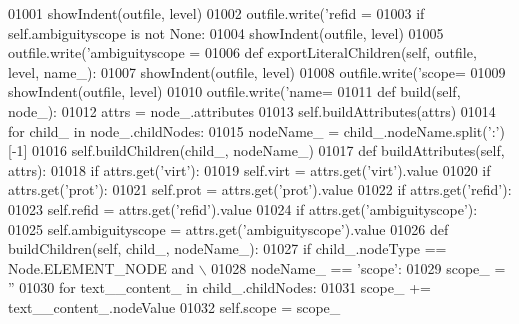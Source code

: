 \begin{DoxyCode}
{{{{{{{{{{{{{{{{{{{{{{{{{{{{{{{{{{{{{{{{{{{{{{{01001             showIndent(outfile, level)
01002             outfile.write(\textcolor{stringliteral}{'refid = %
01003         \textcolor{keywordflow}{if} self.ambiguityscope \textcolor{keywordflow}{is} \textcolor{keywordflow}{not} \textcolor{keywordtype}{None}:
01004             showIndent(outfile, level)
01005             outfile.write(\textcolor{stringliteral}{'ambiguityscope = %
01006     \textcolor{keyword}{def }exportLiteralChildren(self, outfile, level, name\_):
01007         showIndent(outfile, level)
01008         outfile.write(\textcolor{stringliteral}{'scope=%
01009         showIndent(outfile, level)
01010         outfile.write(\textcolor{stringliteral}{'name=%
01011     \textcolor{keyword}{def }build(self, node\_):
01012         attrs = node\_.attributes
01013         self.buildAttributes(attrs)
01014         \textcolor{keywordflow}{for} child\_ \textcolor{keywordflow}{in} node\_.childNodes:
01015             nodeName\_ = child\_.nodeName.split(\textcolor{stringliteral}{':'})[-1]
01016             self.buildChildren(child\_, nodeName\_)
01017     \textcolor{keyword}{def }buildAttributes(self, attrs):
01018         \textcolor{keywordflow}{if} attrs.get(\textcolor{stringliteral}{'virt'}):
01019             self.virt = attrs.get(\textcolor{stringliteral}{'virt'}).value
01020         \textcolor{keywordflow}{if} attrs.get(\textcolor{stringliteral}{'prot'}):
01021             self.prot = attrs.get(\textcolor{stringliteral}{'prot'}).value
01022         \textcolor{keywordflow}{if} attrs.get(\textcolor{stringliteral}{'refid'}):
01023             self.refid = attrs.get(\textcolor{stringliteral}{'refid'}).value
01024         \textcolor{keywordflow}{if} attrs.get(\textcolor{stringliteral}{'ambiguityscope'}):
01025             self.ambiguityscope = attrs.get(\textcolor{stringliteral}{'ambiguityscope'}).value
01026     \textcolor{keyword}{def }buildChildren(self, child\_, nodeName\_):
01027         \textcolor{keywordflow}{if} child\_.nodeType == Node.ELEMENT\_NODE \textcolor{keywordflow}{and} \(\backslash\)
01028             nodeName\_ == \textcolor{stringliteral}{'scope'}:
01029             scope\_ = \textcolor{stringliteral}{''}
01030             \textcolor{keywordflow}{for} text\_\_content\_ \textcolor{keywordflow}{in} child\_.childNodes:
01031                 scope\_ += text\_\_content\_.nodeValue
01032             self.scope = scope\_
}}}}}}}}}}}}}}}}}}}}}}}}}}}}}}}}}}}}}}}}}}}}}}}}}}}
\end{DoxyCode}
